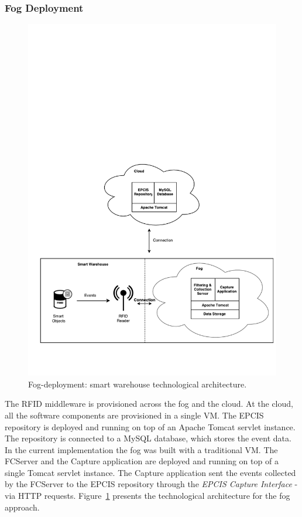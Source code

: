 \subsubsection{Fog Deployment}
\label{subs:imp_smart_warehouse_fog}

\begin{figure}[ht!]
\centering
\includegraphics[width=\textwidth]{./images/implementation_fog_architecture}
\caption[Fog-deployment: technological architecture.]{Fog-deployment: smart warehouse technological architecture.}
\label{fig:implementation_fog_architecture}
\end{figure}

The \gls{RFID} middleware is provisioned across the fog and the cloud. At the cloud,
all the software components are provisioned in a single \gls{VM}. The \gls{EPCIS} repository is deployed
and running on top of an Apache Tomcat servlet instance. The repository is connected to a MySQL
database, which stores the event data. In the current implementation the fog was built with a traditional
\gls{VM}. The \gls{FCServer} and the Capture application are deployed and running on top of a single
Tomcat servlet instance. The Capture application sent the events collected by the \gls{FCServer} to
the \gls{EPCIS} repository through the \textit{\gls{EPCIS} Capture Interface} - via \gls{HTTP} requests.
Figure~\ref{fig:implementation_fog_architecture} presents the technological architecture for the fog
approach.\\

